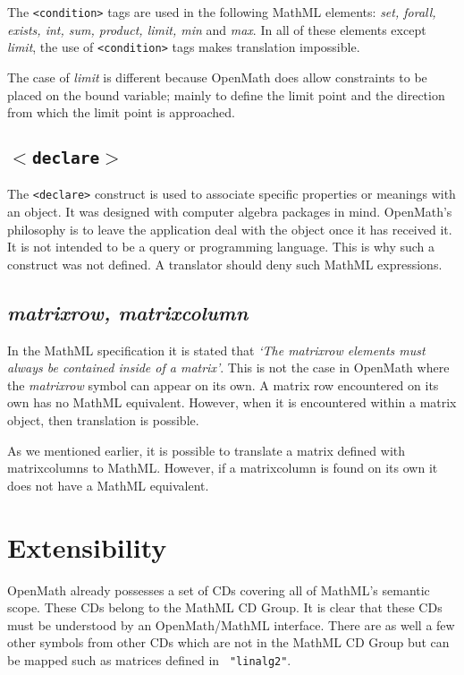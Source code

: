 The \verb|<condition>| tags are used in the following MathML elements:
{\it set, forall, exists, int, sum, product, limit, min} and {\it max}.
In all of these elements except {\it limit}, the use of
\verb|<condition>| tags makes translation impossible.

The case of {\it limit} is different because OpenMath does allow
constraints to be placed on the bound variable; mainly to define the
limit point and the direction from which the limit point is approached.

\subsection{{\tt $<$declare$>$}}

The \verb|<declare>| construct is used to associate specific properties
or meanings with an object. It was designed with computer algebra
packages in mind. OpenMath's philosophy is to leave the application
deal with the object once it has received it. It is not intended to be
a query or programming language. This is why such a construct was not
defined. A translator should deny such MathML expressions.

\subsection{{\it matrixrow, matrixcolumn}}

In the MathML specification it is stated that {\it `The matrixrow
elements must always be contained inside of a matrix'}. This is not the
case in OpenMath where the {\it matrixrow} symbol can appear on its
own.  A matrix row encountered on its own has no MathML equivalent.
However, when it is encountered within a matrix object, then
translation is possible.

As we mentioned earlier, it is possible to translate a matrix defined
with matrixcolumns to MathML. However, if a matrixcolumn is found on
its own it does not have a MathML equivalent.


\section{Extensibility}

OpenMath already possesses a set of CDs covering all of MathML's
semantic scope. These CDs belong to the MathML CD Group.  It is clear
that these CDs must be understood by an OpenMath/MathML interface.  
There are as well a few other symbols from other CDs which are not in
the MathML CD Group but can be mapped such as matrices defined in {\tt
"linalg2"}.


